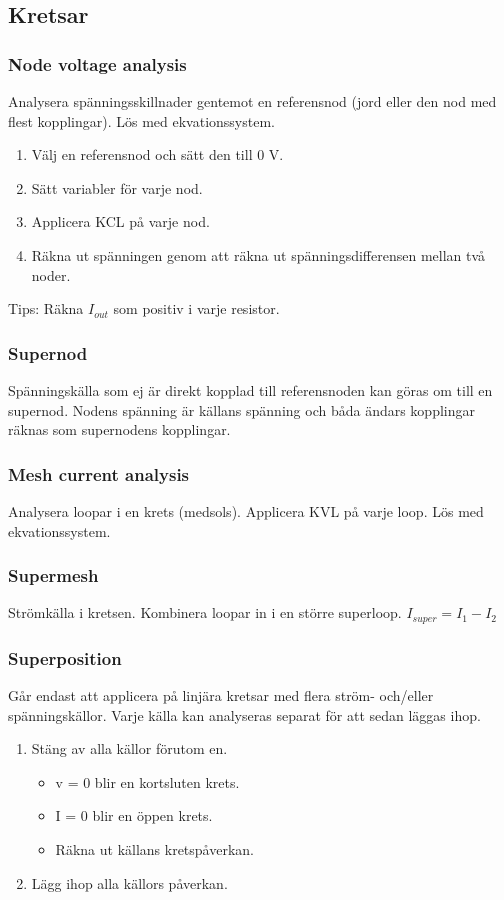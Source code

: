 \subsection{Kretsar}
\subsubsection*{Node voltage analysis}
Analysera spänningsskillnader gentemot en referensnod (jord eller den nod med flest kopplingar). Lös med ekvationssystem.

\begin{enumerate}
	\item Välj en referensnod och sätt den till 0 V.
	\item Sätt variabler för varje nod.
	\item Applicera KCL på varje nod.
	\item Räkna ut spänningen genom att räkna ut spänningsdifferensen mellan två noder.
\end{enumerate}

Tips: Räkna $ I_{out} $ som positiv i varje resistor. 

\subsubsection*{Supernod}
Spänningskälla som ej är direkt kopplad till referensnoden kan göras om till en supernod. Nodens spänning är källans spänning och båda ändars kopplingar räknas som supernodens kopplingar.

\subsubsection*{Mesh current analysis}
Analysera loopar i en krets (medsols). Applicera KVL på varje loop. Lös med ekvationssystem.

\subsubsection*{Supermesh}
Strömkälla i kretsen. Kombinera loopar in i en större superloop. $ I_{super} = I_1 - I_2 $

\subsubsection*{Superposition}
Går endast att applicera på linjära kretsar med flera ström- och/eller spänningskällor. Varje källa kan analyseras separat för att sedan läggas ihop.
\begin{enumerate}
	\item Stäng av alla källor förutom en.
	\begin{itemize}
		\item v = 0 blir en kortsluten krets.
		\item I = 0 blir en öppen krets.
		\item Räkna ut källans kretspåverkan.
	\end{itemize}
	\item Lägg ihop alla källors påverkan.
\end{enumerate}